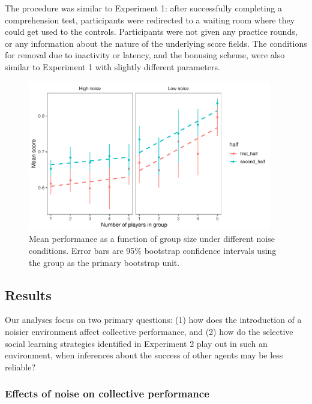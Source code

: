 \documentclass[12pt,letterpaper]{article}
\begin{document}
The procedure was similar to Experiment 1: after successfully completing a comprehension test,  participants were redirected to a waiting room where they could get used to the controls.  
Participants were not given any practice rounds, or any information about the nature of the underlying score fields.
The conditions for removal due to inactivity or latency, and the bonusing scheme, were also similar to Experiment 1 with slightly different parameters.

\begin{figure}[t!]
  \centering
  \includegraphics[width=0.95\textwidth]{./figures/performance-summary}
  \caption{Mean performance as a function of group size under different noise conditions.  Error bars are 95\% bootstrap confidence intervals using the group as the primary bootstrap unit.}
  \label{fig:performance}
\end{figure}

\subsection{Results}

Our analyses focus on two primary questions: (1) how does the introduction of a noisier environment affect collective performance, and (2) how do the selective social learning strategies identified in Experiment 2 play out in such an environment, when inferences about the success of other agents may be less reliable?

\subsubsection{Effects of noise on collective performance}
\end{document}
